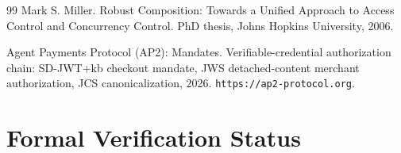 \documentclass[11pt,a4paper]{article}
\theoremstyle{definition}
\begin{document}
\begin{thebibliography}{99}
Mark S. Miller.
\newblock Robust Composition: Towards a Unified Approach to Access Control and Concurrency Control.
\newblock PhD thesis, Johns Hopkins University, 2006.

Agent Payments Protocol (AP2): Mandates.
\newblock Verifiable-credential authorization chain: SD-JWT+kb checkout mandate, JWS detached-content merchant authorization, JCS canonicalization, 2026.
\newblock \texttt{https://ap2-protocol.org}.

\end{thebibliography}

\appendix

\section{Formal Verification Status}\label{app:anchor-mech}
\end{document}

